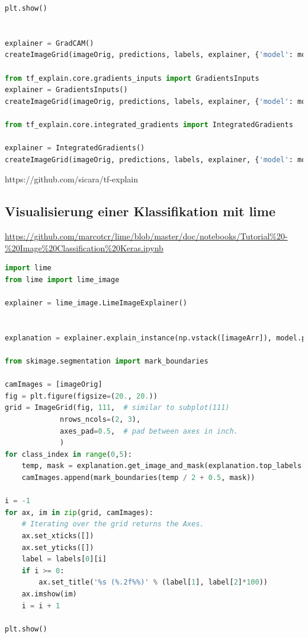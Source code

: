 \documentclass[
  12pt, %
  a4paper, %
  oneside, %
  openany, 
  numbers=noenddot, %
  BCOR=5mm, %
  parskip=half*, %
  thesis, %
]{bfhbook}
\begin{document}
\begin{lstlisting}[language=Python, caption=Visualisiertes Neuronales Netz mit Tensorflow und tf-explain]
    plt.show()


explainer = GradCAM()
createImageGrid(imageOrig, predictions, labels, explainer, {'model': model, 'layer_name': 'block5_conv3', 'validation_data': data})

from tf_explain.core.gradients_inputs import GradientsInputs
explainer = GradientsInputs()
createImageGrid(imageOrig, predictions, labels, explainer, {'model': model, 'validation_data': (np.array([imageArr]), None)})

from tf_explain.core.integrated_gradients import IntegratedGradients

explainer = IntegratedGradients()
createImageGrid(imageOrig, predictions, labels, explainer, {'model': model, 'validation_data': (np.array([imageArr]), None)})
\end{lstlisting}
https://github.com/sicara/tf-explain

\subsection{Visualisierung einer Klassifikation mit lime}
\url{https://github.com/marcotcr/lime/blob/master/doc/notebooks/Tutorial\%20-\%20Image\%20Classification\%20Keras.ipynb}
\begin{lstlisting}[language=Python, caption=Visualisiertes Neuronales Netz mit Tensorflow und lime]
import lime 
from lime import lime_image

explainer = lime_image.LimeImageExplainer()


explanation = explainer.explain_instance(np.vstack([imageArr]), model.predict, top_labels=5, hide_color=0, num_samples=1000)

from skimage.segmentation import mark_boundaries

camImages = [imageOrig]
fig = plt.figure(figsize=(20., 20.))
grid = ImageGrid(fig, 111,  # similar to subplot(111)
             nrows_ncols=(2, 3),
             axes_pad=0.5,  # pad between axes in inch.
             )
for class_index in range(0,5):
    temp, mask = explanation.get_image_and_mask(explanation.top_labels[class_index], positive_only=True, num_features=5, hide_rest=True)
    camImages.append(mark_boundaries(temp / 2 + 0.5, mask))

i = -1
for ax, im in zip(grid, camImages):
    # Iterating over the grid returns the Axes.
    ax.set_xticks([])
    ax.set_yticks([])
    label = labels[0][i]
    if i >= 0:
        ax.set_title('%s (%.2f%%)' % (label[1], label[2]*100))
    ax.imshow(im)
    i = i + 1

plt.show()
\end{lstlisting}

\appendix
\printglossary[type=\acronymtype]
\printglossary[type=main]
\listoffigures
\begingroup
\let\clearpage\relax
\listoftables
\printbibliography[type=article,title={Literaturverzeichnis Artikel}]

\printbibliography[type=book,title={Literaturverzeichnis Bücher}]

\printbibliography[type=misc,title={Linkverzeichnis}]
\lstlistoflistings
\endgroup
\end{document}
